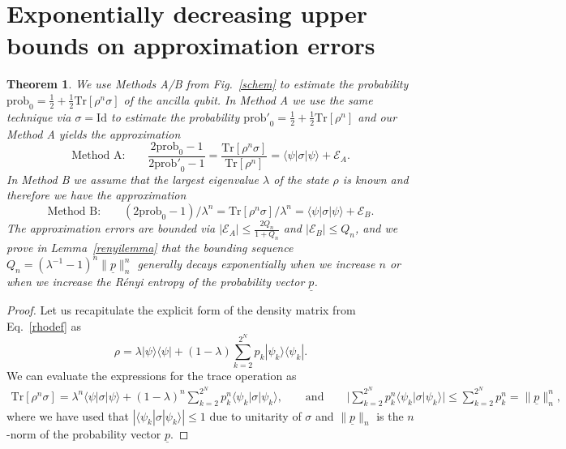\documentclass[aps,prx,showpacs,twocolumn,reprint]{revtex4-2}
\newtheorem{theorem}{Theorem}
\newcommand{\tr}{\mathrm{Tr}}
\newcommand{\prob}{\mathrm{prob}_0}
\newcommand{\qn}{Q_n}
\begin{document}
{\clearpage

\section{Exponentially decreasing upper bounds on approximation errors}
	
	
\begin{theorem}	\label{theo2}
	We use Methods A/B from Fig.~\ref{schem} to estimate the probability
	$\mathrm{prob}_0 = \tfrac{1}{2} + \tfrac{1}{2}\tr[\rho^n \sigma]$ of the ancilla qubit.
	In Method A we use the same technique via $\sigma = \mathrm{Id}$ to estimate the
	probability $\mathrm{prob'}_0 = \tfrac{1}{2} + \tfrac{1}{2}\tr[\rho^n]$
	and our Method A yields the approximation
	\begin{equation*}
	\text{Method A:} \quad \quad 
	\frac{2\mathrm{prob}_0-1}{2\mathrm{prob'}_0-1}
	=
	\frac{\tr[\rho^n \sigma]} {\tr[\rho^n]} =  \langle\psi |\sigma | \psi \rangle + \mathcal{E}_A.
	\end{equation*}
	In Method B we assume that the largest eigenvalue $\lambda$ of the state
	$\rho$ is known and therefore we have the approximation
	\begin{equation*}
	\text{Method B:} \quad \quad 
	(2\prob-1)/\lambda^n
	=
	\tr[\rho^n \sigma] / \lambda^n =  \langle\psi |\sigma | \psi \rangle + \mathcal{E}_B.
	\end{equation*}
	The approximation errors are bounded via
	$|\mathcal{E}_A| \leq \frac{ 2 Q_n}{1+Q_n}$ and $|\mathcal{E}_B| \leq Q_n$,
	and we prove in Lemma~\ref{renyilemma} that the bounding sequence $\qn = (\lambda^{-1}-1)^n \lVert \underline{p} \rVert^n_n$
	generally decays exponentially when we increase $n$ or when we increase the R{\'e}nyi entropy
	of the probability vector $\underline{p}$.
\end{theorem}
\begin{proof}
	Let us recapitulate the explicit form of the density matrix from Eq.~\eqref{rhodef} as
	\begin{equation}
	\rho = \lambda | \psi \rangle \langle \psi  | + (1-\lambda) \sum_{k=2}^{2^N} p_k | \psi_k \rangle \langle \psi_k  |.
	\end{equation}
	We can evaluate the expressions for the trace operation as
	\begin{align*}
	\tr[\rho^n \sigma] =  \lambda^n \langle\psi |\sigma | \psi \rangle + (1-\lambda)^n \sum_{k=2}^{2^N} p^n_k \langle\psi_k |\sigma | \psi_k \rangle,
		\quad \quad \text{and} 	\quad \quad 
	\lvert \sum_{k=2}^{2^N} p^n_k \langle\psi_k |\sigma | \psi_k \rangle \rvert
	\leq  \sum_{k=2}^{2^N} p^n_k 	 = \lVert \underline{p} \rVert^n_n,
	\end{align*}
	where we have used that $|\langle\psi_k |\sigma | \psi_k \rangle| \leq 1$ due to unitarity of $\sigma$
	and $\lVert \underline{p} \rVert_n$ is the $n$-norm of the probability vector $\underline{p}$.




\end{proof}}
\end{document}
